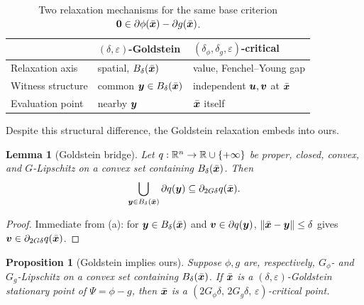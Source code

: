 \documentclass[english]{article}
\newtheorem{lemma}{Lemma}[section]
\newtheorem{proposition}{Proposition}[section]
\begin{document}
\begin{table}[t]
\centering
\caption{Two relaxation mechanisms for the same base criterion
$\bm{0}\in\partial\phi(\bar{\bm{x}})-\partial g(\bar{\bm{x}})$.}
\label{tab:goldstein-vs-ours}
\small
\begin{tabular}{lll}
\hline
 & $(\delta,\varepsilon)$-Goldstein & $(\delta_\phi,\delta_g,\varepsilon)$-critical \\
\hline
Relaxation axis & spatial, $B_\delta(\bar{\bm{x}})$ & value, Fenchel--Young gap \\
Witness structure & common $\bm{y}\in B_\delta(\bar{\bm{x}})$ & independent $\bm{u},\bm{v}$ at $\bar{\bm{x}}$ \\
Evaluation point & nearby $\bm{y}$ & $\bar{\bm{x}}$ itself \\
\hline
\end{tabular}
\end{table}

Despite this structural difference, the Goldstein relaxation embeds into
ours.

\begin{lemma}[Goldstein bridge]
\label{cor:goldstein-bridge}
Let $q:\mathbb{R}^n\to\mathbb{R}\cup\{+\infty\}$ be proper, closed, convex, and
$G$-Lipschitz on a convex set containing $B_\delta(\bar{\bm{x}})$. Then
\[
    \bigcup_{\bm{y}\in B_\delta(\bar{\bm{x}})}\partial q(\bm{y})
    \subseteq
    \partial_{2G\delta}q(\bar{\bm{x}}).
\]
\end{lemma}

\begin{proof}
Immediate from (a): for $\bm{y}\in B_\delta(\bar{\bm{x}})$
and $\bm{v}\in\partial q(\bm{y})$, $\|\bar{\bm{x}}-\bm{y}\|\le\delta$ gives
$\bm{v}\in\partial_{2G\delta}q(\bar{\bm{x}})$.
\end{proof}

\begin{proposition}[Goldstein implies ours]
\label{prop:goldstein-implies-ours}
Suppose $\phi,g$ are, respectively, $G_\phi$- and $G_g$-Lipschitz on a
convex set containing $B_\delta(\bar{\bm{x}})$. If $\bar{\bm{x}}$ is a
$(\delta,\varepsilon)$-Goldstein stationary point of $\Psi=\phi-g$, then
$\bar{\bm{x}}$ is a $(2G_\phi\delta,\,2G_g\delta,\,\varepsilon)$-critical point.
\end{proposition}
\end{document}
